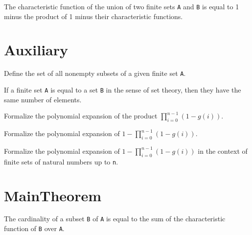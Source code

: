 \begin{lemma}\label{char_fun_union}
  The characteristic function of the union of two finite sets \verb|A| and \verb|B| is equal to 1 minus the product of 1 minus their characteristic functions.
\end{lemma}
\section{Auxiliary}

\begin{definition}\label{Finset.powerset₀}
  \leanok
  Define the set of all nonempty subsets of a given finite set \verb|A|.
\end{definition}

\begin{lemma}\label{card_eq}
  If a finite set \verb|A| is equal to a set \verb|B| in the sense of set theory, then they have the same number of elements.
\end{lemma}

\begin{lemma}\label{mul_expand₃}
  Formalize the polynomial expansion of the product \(\prod_{i=0}^{n-1} (1 - g(i))\).
\end{lemma}

\begin{lemma}\label{mul_expand₂}
  Formalize the polynomial expansion of \(1 - \prod_{i=0}^{n-1} (1 - g(i))\).
\end{lemma}

\begin{lemma}\label{mul_expand₁}
  Formalize the polynomial expansion of \(1 - \prod_{i=0}^{n-1} (1 - g(i))\) in the context of finite sets of natural numbers up to \verb|n|.
\end{lemma}


\section{MainTheorem}

\begin{lemma}\label{card_eq_sum_char_fun}
  The cardinality of a subset \verb|B| of \verb|A| is equal to the sum of the characteristic function of \verb|B| over \verb|A|.
\end{lemma}

